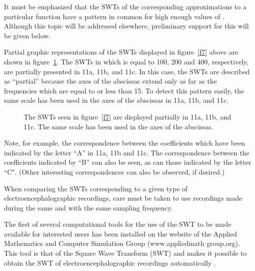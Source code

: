\documentclass[11pt]{rMTA2010} \usepackage[utf8]{inputenc} \usepackage{graphicx} \usepackage{booktabs} \usepackage{array} \usepackage{enumerate}
\begin{document}
It must be emphasized that the SWTs of the corresponding approximations to a particular function have a pattern in common for high enough values of . Although this topic will be addressed elsewhere, preliminary support for this will be given below.

Partial graphic representations of the SWTs displayed in figure~\ref{f7} above are shown in figure~\ref{f10}. The SWTs in which  is equal to 100, 200 and 400, respectively, are partially presented in 11a, 11b, and 11c. In this case, the SWTs are described as ``partial'' because the axes of the abscissas extend only as far as the frequencies which are equal to or less than 15. To detect this pattern easily, the same scale has been used in the axes of the abscissas in 11a, 11b, and 11c.

\begin{figure}[H]
\centering
{}\qquad
\caption[]{}
\end{figure}
\begin{figure}[H]
\ContinuedFloat
{}\qquad
{}\qquad
\caption{The SWTs seen in figure~\ref{f7} are displayed partially in 11a, 11b, and 11c. The same scale has been used in the axes of the abscissas.}
\label{f10}
\end{figure}

Note, for example, the correspondence between the coefficients which have been indicated by the letter ``A'' in 11a, 11b and 11c. The correspondence between the coefficients indicated by ``B'' can also be seen, as can those indicated by the letter ``C". (Other interesting correspondences can also be observed, if desired.)

When comparing the SWTs corresponding to a given type of electroencephalographic recordings, care must be taken to use recordings made during the same  and with the same sampling frequency.

The first of several computational tools for the use of the SWT to be made available for interested users has been installed on the website of the Applied Mathematics and Computer Simulation Group (www.appliedmath group.org). This tool is that of the Square Wave Transform (SWT) and makes it possible to obtain the SWT of electroencephalographic recordings automatically \cite{b6}.
\end{document}
